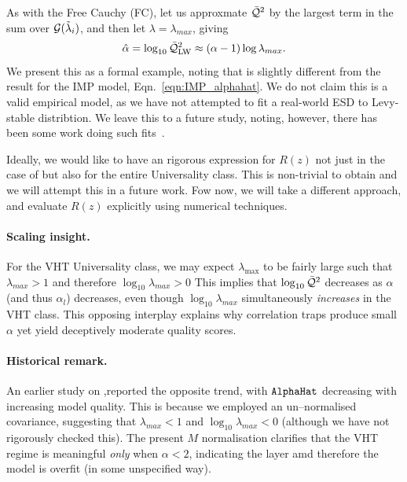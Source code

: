 As with the Free Cauchy (FC), let us approxmate $\bar{\mathcal{Q}}^{2}$ by the largest term in the sum over $\mathcal{G}(\tilde{\lambda}_{i})$, and then let $\lambda=\lambda_{max}$, giving
\begin{equation} 
\label{eqn:LW_model_4} 
\hat\alpha = \log_{10} \bar{\mathcal{Q}}^{2}_{\mathrm{LW}} \approx (\alpha-1)\log\lambda_{max}   .
\end{equation}
We present this as a formal example, noting that is slightly different from the result for the IMP model, Eqn.~\ref{eqn:IMP_alphahat}. 
We do not claim this is a valid empirical model, as we have not attempted to fit a real-world ESD to Levy-stable distribtion.  
We leave this to a future study, noting, however, there has been some work doing such fits~\cite{li2024exploring}.

Ideally, we would like to have an rigorous expression for $R(z)$ not just
in the case of \IdealLearning but also for the entire \FatTailed Universality class.
This is non-trivial to obtain and we will attempt this in a future work.
Fow now, we will take a different approach, and evaluate $R(z)$ explicitly using numerical techniques.

\paragraph{Scaling insight.}
For the VHT Universality class, we may expect $\lambda_{\max}$ to be fairly large such that
$\lambda_{max}>1$ and therefore $\log_{10}\lambda_{max}>0$
This implies that  $\log_{10}\bar{\mathcal{Q}}^{2}$ decreases  as $\alpha$ (and thus $\alpha_l$) decreases, even though
$\log_{10}\lambda_{max}$ simultaneously \emph{increases} in the VHT class.
This opposing interplay explains why correlation traps produce small $\alpha$ yet yield deceptively moderate quality scores.

\paragraph{Historical remark.}
An earlier study on \ALPHAHAT,reported the opposite trend, with $\texttt{AlphaHat}$ decreasing with increasing model quality.
This is because we employed an un–normalised covariance, suggesting that $\lambda_{max}<1$ and $\log_{10}\lambda_{max}<0$
(although we have not rigorously checked this).
The present $M$ normalisation clarifies that the VHT regime is meaningful \emph{only} when $\alpha<2$,
indicating the layer amd therefore the model is overfit (in some unspecified way).


